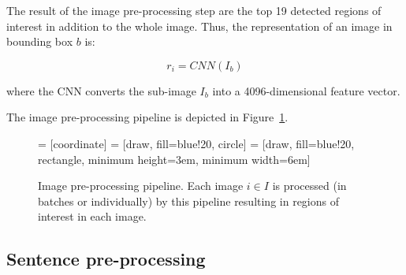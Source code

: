 The result of the image pre-processing step are the top 19 detected regions of interest in addition to the whole image. Thus, the representation of an image in bounding box $b$ is:

\begin{equation}
	r_i = CNN(I_b)
\end{equation}

where the CNN converts the sub-image $I_b$ into a 4096-dimensional feature vector.

The image pre-processing pipeline is depicted in Figure~\ref{fig:image-preprocessing}.

\begin{figure}
\centering  

 = [coordinate]
 = [draw, fill=blue!20, circle]
 = [draw, fill=blue!20, rectangle, 
    minimum height=3em, minimum width=6em]
    
\caption{Image pre-processing pipeline. Each image $i\in I$ is processed (in batches or individually) by this pipeline resulting in regions of interest in each image.}
\label{fig:image-preprocessing}
\end{figure}

\subsection{Sentence pre-processing}
